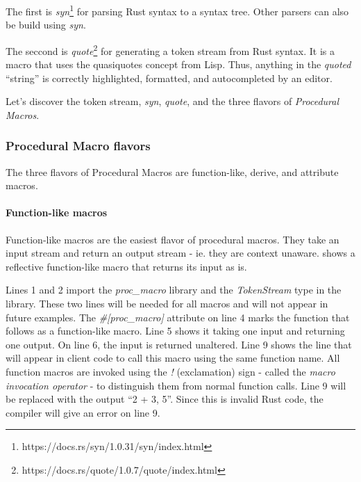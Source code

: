 The first is \textit{syn}\footnote{https://docs.rs/syn/1.0.31/syn/index.html} for parsing Rust syntax to a syntax tree.
Other parsers can also be build using \textit{syn}.

The seccond is \textit{quote}\footnote{https://docs.rs/quote/1.0.7/quote/index.html} for generating a token stream from Rust syntax.
It is a macro that uses the quasiquotes concept from Lisp.
Thus, anything in the \textit{quoted} ``string'' is correctly highlighted, formatted, and autocompleted by an editor.

Let's discover the token stream, \textit{syn}, \textit{quote}, and the three flavors of \textit{Procedural Macros}.

\subsubsection{Procedural Macro flavors}

The three flavors of Procedural Macros are function-like, derive, and attribute macros.

\paragraph{Function-like macros}
Function-like macros are the easiest flavor of procedural macros.
They take an input stream and return an output stream - ie. they are context unaware.
 shows a reflective function-like macro that returns its input as is.


Lines 1 and 2 import the \textit{proc\_macro} library and the \textit{TokenStream} type in the library.
These two lines will be needed for all macros and will not appear in future examples.
The \textit{\#[proc\_macro]} attribute on line 4 marks the function that follows as a function-like macro.
Line 5 shows it taking one \colorbox{input}{input} and returning one \colorbox{output}{output}.
On line 6, the input is returned unaltered.
Line 9 shows the line that will appear in client code to call this macro using the same \colorbox{function}{function name}.
All function macros are invoked using the \textit{!} (exclamation) sign - called the \textit{macro invocation operator} - to distinguish them from normal function calls.
Line 9 will be replaced with the \colorbox{output}{output} ``2 + 3, 5''.
Since this is invalid Rust code, the compiler will give an error on line 9.


